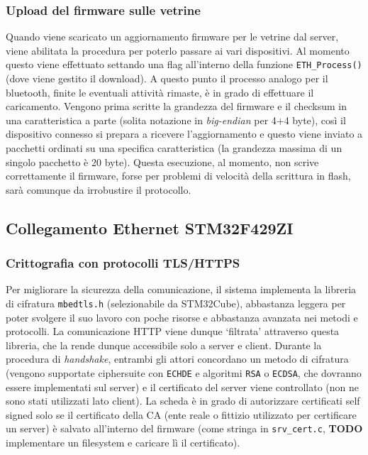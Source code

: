 \subsubsection{Upload del firmware sulle vetrine}

Quando viene scaricato un aggiornamento firmware per le vetrine dal server, viene abilitata la procedura per poterlo passare ai vari dispositivi. Al momento questo viene effettuato settando una flag all'interno della funzione \texttt{ETH\_Process()} (dove viene gestito il download). A questo punto il processo analogo per il bluetooth, finite le eventuali attivit\`a rimaste, \`e in grado di effettuare il caricamento. Vengono prima scritte la grandezza del firmware e il checksum in una caratteristica a parte (solita notazione in \textit{big-endian} per 4+4 byte), cos\`i il dispositivo connesso si prepara a ricevere l'aggiornamento e questo viene inviato a pacchetti ordinati su una specifica caratteristica (la grandezza massima di un singolo pacchetto \`e 20 byte). Questa esecuzione, al momento, non scrive correttamente il firmware, forse per problemi di velocit\`a della scrittura in flash, sar\`a comunque da irrobustire il protocollo.

\subsection{Collegamento Ethernet STM32F429ZI}

\subsubsection{Crittografia con protocolli TLS/HTTPS}

Per migliorare la sicurezza della comunicazione, il sistema implementa la libreria di cifratura \texttt{mbedtls.h} (selezionabile da STM32Cube), abbastanza leggera per poter svolgere il suo lavoro con poche risorse e abbastanza avanzata nei metodi e protocolli. La comunicazione HTTP viene dunque `filtrata' attraverso questa libreria, che la rende dunque accessibile solo a server e client. Durante la procedura di \textit{handshake}, entrambi gli attori concordano un metodo di cifratura (vengono supportate ciphersuite con \texttt{ECHDE} e algoritmi \texttt{RSA} o \texttt{ECDSA}, che dovranno essere implementati sul server) e il certificato del server viene controllato (non ne sono stati utilizzati lato client). La scheda \`e in grado di autorizzare certificati self signed solo se il certificato della CA (ente reale o fittizio utilizzato per certificare un server) \`e salvato all'interno del firmware (come stringa in \texttt{srv\_cert.c}, \textbf{TODO} implementare un filesystem e caricare l\`i il certificato).

